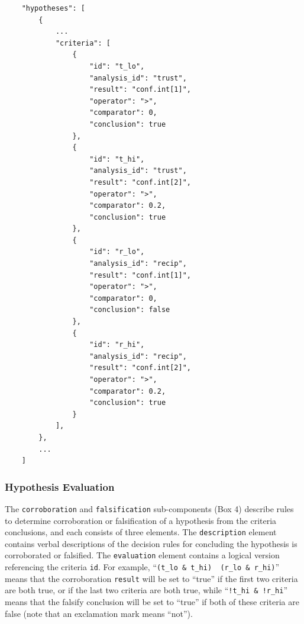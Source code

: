 \documentclass[
  english,
  doc,floatsintext]{apa6}
\begin{document}
\begin{tcolorbox}[colback=black!5!white,colframe=white!5!black,title=Box 3. Criteria for evaluation.]
\begin{verbatim}
    "hypotheses": [
        {
            ...
            "criteria": [
                {
                    "id": "t_lo",
                    "analysis_id": "trust",
                    "result": "conf.int[1]",
                    "operator": ">",
                    "comparator": 0,
                    "conclusion": true
                },
                {
                    "id": "t_hi",
                    "analysis_id": "trust",
                    "result": "conf.int[2]",
                    "operator": ">",
                    "comparator": 0.2,
                    "conclusion": true
                },
                {
                    "id": "r_lo",
                    "analysis_id": "recip",
                    "result": "conf.int[1]",
                    "operator": ">",
                    "comparator": 0,
                    "conclusion": false
                },
                {
                    "id": "r_hi",
                    "analysis_id": "recip",
                    "result": "conf.int[2]",
                    "operator": ">",
                    "comparator": 0.2,
                    "conclusion": true
                }
            ],
        },
        ...
    ]
\end{verbatim}
\end{tcolorbox}

\hypertarget{hypothesis-evaluation}{%
\subsubsection{Hypothesis Evaluation}\label{hypothesis-evaluation}}

The \texttt{corroboration} and \texttt{falsification} sub-components (Box 4) describe rules to determine corroboration or falsification of a hypothesis from the criteria conclusions, and each consists of three elements. The \texttt{description} element contains verbal descriptions of the decision rules for concluding the hypothesis is corroborated or falsified. The \texttt{evaluation} element contains a logical version referencing the criteria \texttt{id}. For example, \enquote{\texttt{(t\_lo\ \&\ t\_hi)\ \textbar{}\ (r\_lo\ \&\ r\_hi)}} means that the corroboration \texttt{result} will be set to \enquote{true} if the first two criteria are both true, or if the last two criteria are both true, while \enquote{\texttt{!t\_hi\ \&\ !r\_hi}} means that the falsify conclusion will be set to \enquote{true} if both of these criteria are false (note that an exclamation mark means \enquote{not}).
\end{document}
